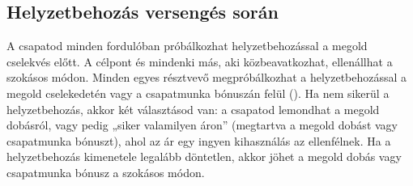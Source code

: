 \subsection{Helyzetbehozás versengés során}

A csapatod minden fordulóban próbálkozhat helyzetbehozással a megold cselekvés előtt. A célpont és mindenki más, aki közbeavatkozhat, ellenállhat a szokásos módon. Minden egyes résztvevő megpróbálkozhat a helyzetbehozással a megold cselekedetén vagy a csapatmunka bónuszán felül (). Ha nem sikerül a helyzetbehozás, akkor két választásod van: a csapatod lemondhat a megold dobásról, vagy pedig „siker valamilyen áron” (megtartva a megold dobást vagy csapatmunka bónuszt), ahol az ár egy ingyen kihasználás az ellenfélnek. Ha a helyzetbehozás kimenetele legalább döntetlen, akkor jöhet a megold dobás vagy csapatmunka bónusz a szokásos módon.
